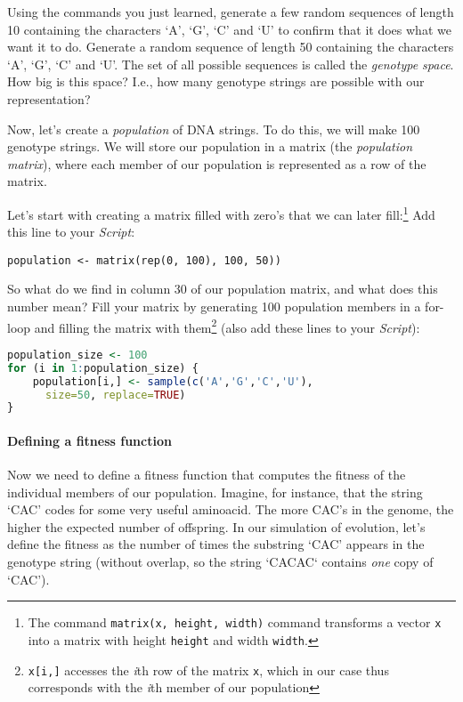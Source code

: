 \documentclass[a4paper, 9pt]{article}
\begin{document}
\begin{exercise}
    \action Using the commands you just learned, generate a few random sequences of length 10 containing the characters `A', `G', `C' and `U' to confirm that it does what we want it to do.
    \action Generate a random sequence of length 50 containing the characters `A', `G', `C' and `U'. 
    \askstar The set of all possible sequences is called the \textit{genotype space}. How big is this space? I.e., how many genotype strings are possible with our representation?
\end{exercise}

Now, let's create a \textit{population} of DNA strings. To do this, we
will make 100 genotype strings.
We will store our population in a matrix (the \textit{population matrix}), where each member of our population is represented as a row of the matrix. 

\begin{exercise}
\action Let's start with creating a matrix filled with zero's that we can later fill:\footnote{The command \texttt{matrix(x, height, width)} command transforms a vector \texttt{x} into a matrix with height \texttt{height} and width \texttt{width}.} Add this line to your \emph{Script}:
  \begin{lstlisting}
population <- matrix(rep(0, 100), 100, 50))
\end{lstlisting}
  So what do we find in column 30 of our population matrix, and what does this number mean?
  \action Fill your matrix by generating 100 population members in a for-loop and filling the matrix with them\footnote{\texttt{x[i,]} accesses the \textit{i}th row of the matrix \texttt{x}, which in our case thus corresponds with the \textit{i}th member of our population} (also add these lines to your \emph{Script}):
  \begin{lstlisting}[language=R]
population_size <- 100
for (i in 1:population_size) {
    population[i,] <- sample(c('A','G','C','U'), 
      size=50, replace=TRUE)
}
    \end{lstlisting}
\end{exercise}


\paragraph{Defining a fitness function}
Now we need to define a fitness function that computes the fitness of
the individual members of our population. Imagine, for instance, that
the string `CAC' codes for some very useful aminoacid. The more CAC's in
the genome, the higher the expected number of offspring. In our
simulation of evolution, let's define the fitness as the number of times
the substring `CAC' appears in the genotype string (without overlap, so the string `CACAC` contains \emph{one} copy of `CAC').
\end{document}
